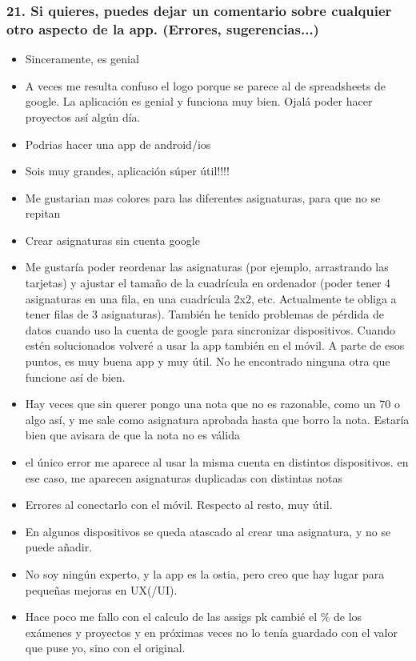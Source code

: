 \subsubsection*{21. Si quieres, puedes dejar un comentario sobre cualquier otro aspecto de la app. (Errores, sugerencias...)}

\begin{itemize}
  \item Sinceramente, es genial
  \item A veces me resulta confuso el logo porque se parece al de spreadsheets de google. La aplicación es genial y funciona muy bien. Ojalá poder hacer proyectos así algún día.
  \item Podrias hacer una app de android/ios
  \item Sois muy grandes, aplicación súper útil!!!!
  \item Me gustarian mas colores para las diferentes asignaturas, para que no se repitan
  \item Crear asignaturas sin cuenta google
  \item Me gustaría poder reordenar las asignaturas (por ejemplo, arrastrando las tarjetas) y ajustar el tamaño de la cuadrícula en ordenador (poder tener 4 asignaturas en una fila, en una cuadrícula 2x2, etc. Actualmente te obliga a tener filas de 3 asignaturas). También he tenido problemas de pérdida de datos cuando uso la cuenta de google para sincronizar dispositivos. Cuando estén solucionados volveré a usar la app también en el móvil. A parte de esos puntos, es muy buena app y muy útil. No he encontrado ninguna otra que funcione así de bien.
  \item Hay veces que sin querer pongo una nota que no es razonable, como un 70 o algo así, y me sale como asignatura aprobada hasta que borro la nota. Estaría bien que avisara de que la nota no es válida
  \item el único error me aparece al usar la misma cuenta en distintos dispositivos. en ese caso, me aparecen asignaturas duplicadas con distintas notas
  \item Errores al conectarlo con el móvil. Respecto al resto, muy útil.
  \item En algunos dispositivos se queda atascado al crear una asignatura, y no se puede añadir.
  \item No soy ningún experto, y la app es la ostia, pero creo que hay lugar para pequeñas mejoras en UX(/UI).
  \item Hace poco me fallo con el calculo de las assigs pk cambié el \% de los exámenes y proyectos y en próximas veces no lo tenía guardado con el valor que puse yo, sino con el original.

\end{itemize}
